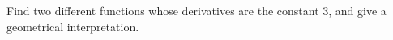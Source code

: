 Find two different functions whose derivatives are the constant 3, and give a geometrical
interpretation.

